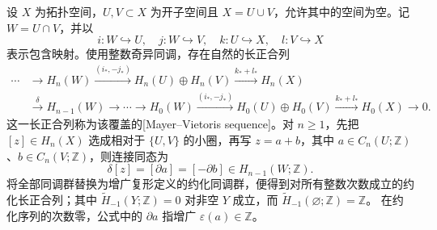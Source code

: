 \begin{theorem}\label{g2:thm:mayer-vietoris}
	设 \(X\) 为拓扑空间，\(U,V\subset X\) 为开子空间且 \(X=U\cup V\)，允许其中的空间为空。记 \(W=U\cap V\)，并以
	\[
		i:W\hookrightarrow U,\quad j:W\hookrightarrow V,\quad
		k:U\hookrightarrow X,\quad l:V\hookrightarrow X
	\]
	表示包含映射。使用整数奇异同调，存在自然的长正合列
	\[
		\begin{aligned}
			\cdots&\longrightarrow H_n(W)
			\xrightarrow{(i_*,-j_*)}H_n(U)\oplus H_n(V)
			\xrightarrow{k_*+l_*}H_n(X)\\
			&\xrightarrow{\delta}H_{n-1}(W)
			\longrightarrow\cdots\longrightarrow H_0(W)
			\xrightarrow{(i_*,-j_*)}H_0(U)\oplus H_0(V)
			\xrightarrow{k_*+l_*}H_0(X)\longrightarrow0.
		\end{aligned}
	\]
	这一长正合列称为该覆盖的[Mayer--Vietoris sequence]。对 \(n\ge1\)，先把 \([z]\in H_n(X)\) 选成相对于 \(\{U,V\}\) 的小圈，再写 \(z=a+b\)，其中 \(a\in C_n(U;\mathbb Z)\)、\(b\in C_n(V;\mathbb Z)\)，则连接同态为
	\begin{equation}\label{g2:eq:mayer-vietoris-connecting}
		\delta[z]=[\partial a]=[-\partial b]\in H_{n-1}(W;\mathbb Z).
	\end{equation}
	将全部同调群替换为增广复形定义的约化同调群，便得到对所有整数次数成立的约化长正合列；其中
	\(\widetilde H_{-1}(Y;\mathbb Z)=0\) 对非空 \(Y\) 成立，而
	\(\widetilde H_{-1}(\varnothing;\mathbb Z)=\mathbb Z\)。
	在约化序列的次数零，公式中的 \(\partial a\) 指增广 \(\varepsilon(a)\in\mathbb Z\)。
\end{theorem}
